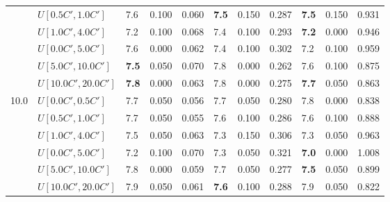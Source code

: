 \begin{table}[h]
{\begin{tabular}{|l|l||l|l|l||l|l|l||l|l|l|}
       & $U[0.5C',1.0C']$ & 7.6 & 0.100 & 0.060 & \textbf{7.5} & 0.150 & 0.287 & \textbf{7.5} & 0.150 & 0.931 \\
       & $U[1.0C',4.0C']$ & 7.2 & 0.100 & 0.068 & 7.4 & 0.100 & 0.293 & \textbf{7.2} & 0.000 & 0.946 \\
       & $U[0.0C',5.0C']$ & 7.6 & 0.000 & 0.062 & 7.4 & 0.100 & 0.302 & 7.2 & 0.100 & 0.959 \\
       & $U[5.0C',10.0C']$ & \textbf{7.5} & 0.050 & 0.070 & 7.8 & 0.000 & 0.262 & 7.6 & 0.100 & 0.875 \\
       & $U[10.0C',20.0C']$ & \textbf{7.8} & 0.000 & 0.063 & 7.8 & 0.000 & 0.275 & \textbf{7.7} & 0.050 & 0.863 \\
      \hline\hline
      \multirow{6}{*}{10.0} & $U[0.0C',0.5C']$ & 7.7 & 0.050 & 0.056 & 7.7 & 0.050 & 0.280 & 7.8 & 0.000 & 0.838 \\
       & $U[0.5C',1.0C']$ & 7.7 & 0.050 & 0.055 & 7.6 & 0.100 & 0.286 & 7.6 & 0.100 & 0.888 \\
       & $U[1.0C',4.0C']$ & 7.5 & 0.050 & 0.063 & 7.3 & 0.150 & 0.306 & 7.3 & 0.050 & 0.963 \\
       & $U[0.0C',5.0C']$ & 7.2 & 0.100 & 0.070 & 7.3 & 0.050 & 0.321 & \textbf{7.0} & 0.000 & 1.008 \\
       & $U[5.0C',10.0C']$ & 7.8 & 0.000 & 0.059 & 7.7 & 0.050 & 0.277 & \textbf{7.5} & 0.050 & 0.899 \\
       & $U[10.0C',20.0C']$ & 7.9 & 0.050 & 0.061 & \textbf{7.6} & 0.100 & 0.288 & 7.9 & 0.050 & 0.822 \\
      \hline
      \end{tabular}
      }
      \label{tab:pcpn100RecoloredTT}\end{table}



